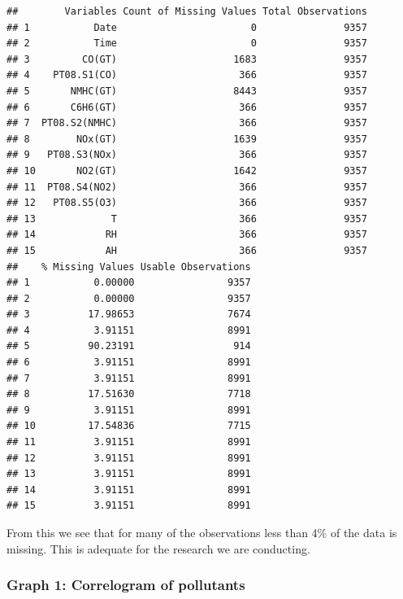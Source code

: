 \documentclass[]{article}
\begin{document}
\begin{verbatim}
##        Variables Count of Missing Values Total Observations
## 1           Date                       0               9357
## 2           Time                       0               9357
## 3         CO(GT)                    1683               9357
## 4    PT08.S1(CO)                     366               9357
## 5       NMHC(GT)                    8443               9357
## 6       C6H6(GT)                     366               9357
## 7  PT08.S2(NMHC)                     366               9357
## 8        NOx(GT)                    1639               9357
## 9   PT08.S3(NOx)                     366               9357
## 10       NO2(GT)                    1642               9357
## 11  PT08.S4(NO2)                     366               9357
## 12   PT08.S5(O3)                     366               9357
## 13             T                     366               9357
## 14            RH                     366               9357
## 15            AH                     366               9357
##    % Missing Values Usable Observations
## 1           0.00000                9357
## 2           0.00000                9357
## 3          17.98653                7674
## 4           3.91151                8991
## 5          90.23191                 914
## 6           3.91151                8991
## 7           3.91151                8991
## 8          17.51630                7718
## 9           3.91151                8991
## 10         17.54836                7715
## 11          3.91151                8991
## 12          3.91151                8991
## 13          3.91151                8991
## 14          3.91151                8991
## 15          3.91151                8991
\end{verbatim}

From this we see that for many of the observations less than 4\% of the
data is missing. This is adequate for the research we are conducting.

\hypertarget{graph-1-correlogram-of-pollutants}{%
\subsubsection{Graph 1: Correlogram of
pollutants}\label{graph-1-correlogram-of-pollutants}}
\end{document}
